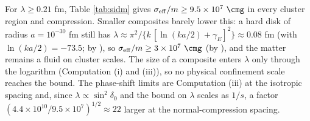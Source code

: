 For $\lambda \ge 0.21$ fm, Table \ref{tab:sidm} gives $\sigma_{\mathrm{eff}}/m \ge 9.5 \times 10^{7}\ \cmg$ in every cluster region and compression. Smaller composites barely lower this: a hard disk of radius $a = 10^{-30}$ fm still has $\lambda \approx \pi^{2}/\{k\,[\ln(ka/2) + \gamma_{E}]^{2}\} \approx 0.08$ fm (with $\ln(ka/2) = -73.5$; by ), so $\sigma_{\mathrm{eff}}/m \ge 3 \times 10^{7}\ \cmg$ (by ), and the matter remains a fluid on cluster scales. The size of a composite enters $\lambda$ only through the logarithm (Computation (i) and (iii)), so no physical confinement scale reaches the bound. The phase-shift limits are Computation (iii) at the isotropic spacing and, since $\lambda \propto \sin^{2}\delta_{0}$ and the bound on $\lambda$ scales as $1/s$, a factor $(4.4 \times 10^{10}/9.5 \times 10^{7})^{1/2} \approx 22$ larger at the normal-compression spacing.
